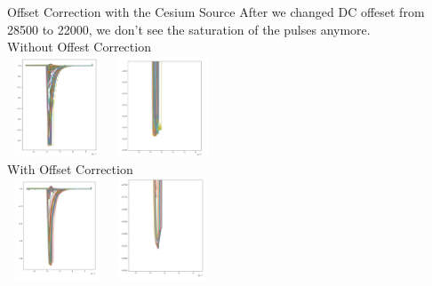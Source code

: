 \documentclass{beamer}
\begin{document}
\begin{frame}{Offset Correction with the Cesium Source}
After we changed DC offeset from 28500 to 22000, we don't see the saturation of the pulses anymore.\\
\centering
Without Offest Correction\\
\includegraphics[width=3cm, height=3cm]{../btl_files/offset_plot/without_offset.png}
\includegraphics[width=3cm, height=3cm]{../btl_files/offset_plot/without_offset_zoom.png}\\
With Offset Correction \\
\includegraphics[width=3cm, height=3cm]{../btl_files/offset_plot/with_offset.png}
\includegraphics[width=3cm, height=3cm]{../btl_files/offset_plot/with_offset_zoom.png}\\
\end{frame}
\end{document}
